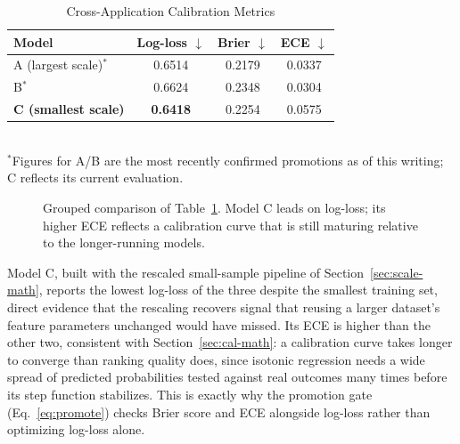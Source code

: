 \documentclass[conference]{IEEEtran}
\begin{document}
\begin{table}[!t]
\caption{Cross-Application Calibration Metrics}
\label{tab:crosssport}
\centering
\begin{tabular}{lccc}
\toprule
Model & Log-loss $\downarrow$ & Brier $\downarrow$ & ECE $\downarrow$ \\
\midrule
A (largest scale)$^{*}$  & 0.6514 & 0.2179 & 0.0337 \\
B$^{*}$  & 0.6624 & 0.2348 & 0.0304 \\
\textbf{C (smallest scale)} & \textbf{0.6418} & 0.2254 & 0.0575 \\
\bottomrule
\end{tabular}
\\[2pt]
{\footnotesize $^{*}$Figures for A/B are the most recently confirmed
promotions as of this writing; C reflects its current evaluation.}
\end{table}

\begin{figure}[!t]
\centering
{}
\caption{Grouped comparison of Table~\ref{tab:crosssport}. Model C
leads on log-loss; its higher ECE reflects a calibration curve that is
still maturing relative to the longer-running models.}
\label{fig:barchart}
\end{figure}

Model C, built with the rescaled small-sample pipeline of
Section~\ref{sec:scale-math}, reports the lowest log-loss of the three
despite the smallest training set, direct evidence that the rescaling
recovers signal that reusing a larger dataset's feature parameters
unchanged would have missed. Its ECE is higher than the other two,
consistent with Section~\ref{sec:cal-math}: a calibration curve takes
longer to converge than ranking quality does, since isotonic
regression needs a wide spread of predicted probabilities tested
against real outcomes many times before its step function stabilizes.
This is exactly why the promotion gate (Eq.~\eqref{eq:promote}) checks
Brier score and ECE alongside log-loss rather than optimizing log-loss
alone.
\end{document}
